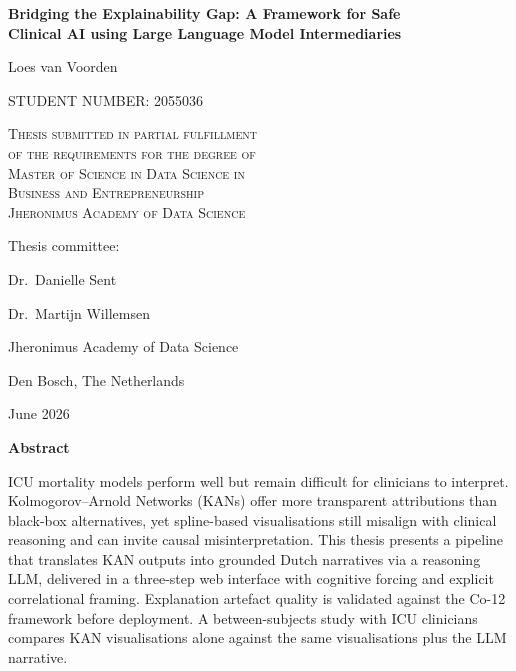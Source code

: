 \documentclass[12pt, a4paper]{article}
\begin{document}
\begin{titlepage}
  \centering
  \vspace*{1.5cm}
  {\Large\bfseries Bridging the Explainability Gap: A Framework for Safe\\
  Clinical AI using Large Language Model Intermediaries\par}
  \vfill
  {\large Loes van Voorden\par}
  \vspace{0.6cm}
  {\normalsize STUDENT NUMBER: 2055036\par}
  \vfill
  \begin{minipage}{\textwidth}
    \centering
    {\normalsize
    \textsc{Thesis submitted in partial fulfillment}\\[0.35em]
    \textsc{of the requirements for the degree of}\\[1.4em]
    \textsc{Master of Science in Data Science in}\\[0.25em]
    \textsc{Business and Entrepreneurship}\\[0.8em]
    \textsc{Jheronimus Academy of Data Science}\par}
  \end{minipage}
  \vfill
  {\normalsize Thesis committee:\par}
  \vspace{0.4cm}
  {\normalsize Dr.\ Danielle Sent\par}
  {\normalsize Dr.\ Martijn Willemsen\par}
  \vfill
  {\normalsize Jheronimus Academy of Data Science\par}
  {\normalsize Den Bosch, The Netherlands\par}
  {\normalsize June 2026\par}
  \vspace*{1.5cm}
\end{titlepage}

\noindent\textbf{Abstract}\par
\vspace{0.6em}
\noindent ICU mortality models perform well but remain difficult for clinicians
to interpret.
Kolmogorov--Arnold Networks (KANs) offer more transparent attributions than
black-box alternatives, yet spline-based visualisations still misalign with
clinical reasoning and can invite causal misinterpretation.
This thesis presents a pipeline that translates KAN outputs into grounded Dutch
narratives via a reasoning LLM, delivered in a three-step web interface with
cognitive forcing and explicit correlational framing.
Explanation artefact quality is validated against the Co-12 framework before
deployment.
A between-subjects study with ICU clinicians compares KAN visualisations alone
against the same visualisations plus the LLM narrative.
\end{document}
